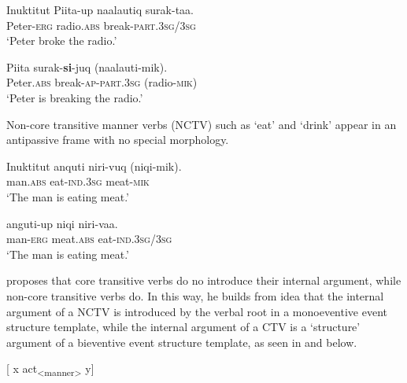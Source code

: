 \documentclass[output=paper,modfonts,nonflat,newtxmath]{langsci/langscibook}
\begin{document}
\ea%
    Inuktitut \citep{Spreng2012} \label{ex:basilico:3}
    \ea \label{ex:basilico:3a}
    \gll Piita-up  naalautiq  surak-taa. \\
    Peter-\textsc{erg}  radio.\textsc{abs} break-\textsc{part}.3\textsc{sg}/3\textsc{sg}\\
    \glt ‘Peter broke the radio.’
    
    \ex \label{ex:basilico:3b}
    \gll Piita    surak-\textbf{si}{}-juq    (naalauti-mik).\\
    Peter.\textsc{abs}  break-\textsc{ap}{}-\textsc{\textsc{part}}.3\textsc{sg}  (radio{}-\textsc{mik})\\
    \glt ‘Peter is breaking the radio.’
    
    \z
    \z

Non-core transitive manner verbs (NCTV) such as ‘eat’ and ‘drink’ appear in an antipassive frame with no special morphology. 

\ea%
    Inuktitut \citep{Spreng2012}\label{ex:basilico:4}
    \ea \label{ex:basilico:4a}
    \gll anquti  niri-vuq  (niqi-mik).\\
    man.\textsc{\textsc{abs}}  eat{}-\textsc{\textsc{ind}}.3\textsc{sg}  meat{}-\textsc{mik}\\
    \glt `The man is eating meat.'
    
    \ex \label{ex:basilico:4b}
    \gll anguti-up  niqi    niri-vaa.\\
    man{}-\textsc{\textsc{erg}}  meat.\textsc{\textsc{abs}}  eat{}-\textsc{\textsc{ind}}.3\textsc{sg}/3\textsc{sg}
    \\
    \glt `The man is eating meat.'
    \z
    \z


\citet{Basilico2017} proposes that core transitive verbs do no introduce their internal argument, while non-core transitive verbs do. In this way, he builds from  idea that the internal argument of a NCTV is introduced by the verbal root in a monoeventive event structure template, while the internal argument of a CTV is a ‘structure’ argument of a bieventive event structure template, as seen in  and  below.

\ea%
    \label{ex:basilico:5}
     {[} x act\textsubscript{<manner>} y{]}
    \z
\end{document}
